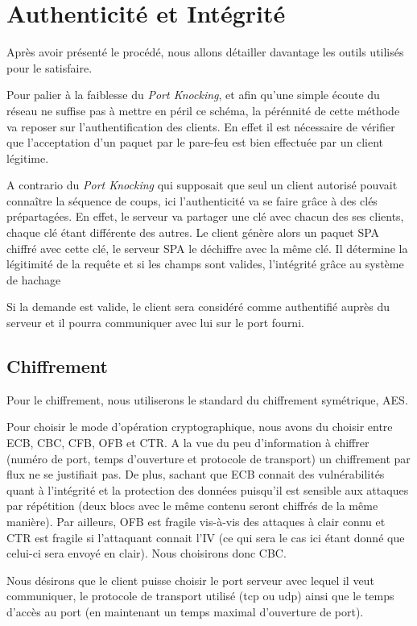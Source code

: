 \chapter{Authenticité et Intégrité}
Après avoir présenté le procédé, nous allons détailler davantage les outils utilisés pour le satisfaire.

Pour palier à la faiblesse du \emph{Port Knocking}, et afin qu'une simple écoute du réseau ne suffise pas à mettre en péril ce schéma, la pérénnité de cette méthode va reposer sur l'authentification des clients. En effet il est nécessaire de vérifier que l'acceptation d'un paquet par le pare-feu est bien effectuée par un client légitime.

A contrario du \emph{Port Knocking} qui supposait que seul un client autorisé pouvait connaître la séquence de coups, ici l'authenticité va se faire grâce à des clés prépartagées. En effet, le serveur va partager une clé avec chacun des ses clients, chaque clé étant différente des autres. 
Le client génère alors un paquet SPA chiffré avec cette clé, le serveur SPA le déchiffre avec la même clé. Il détermine la légitimité de la requête et si les champs sont valides, l'intégrité grâce au système de hachage

Si la demande est valide, le client sera considéré comme authentifié auprès du serveur et il pourra communiquer avec lui sur le port fourni.

\section{Chiffrement}
Pour le chiffrement, nous utiliserons le standard du chiffrement symétrique, AES. 

Pour choisir le mode d'opération cryptographique, nous avons du choisir entre ECB, CBC, CFB, OFB et CTR. 
A la vue du peu d'information à chiffrer (numéro de port, temps d'ouverture et protocole de transport) un chiffrement par flux ne se justifiait pas.
De plus, sachant que ECB connait des vulnérabilités quant à l'intégrité et la protection des données puisqu'il est sensible aux attaques par répétition (deux blocs avec le même contenu seront chiffrés de la même manière).
Par ailleurs, OFB est fragile vis-à-vis des attaques à clair connu et CTR est fragile si l'attaquant connait l'IV (ce qui sera le cas ici étant donné que celui-ci sera envoyé en clair).
Nous choisirons donc CBC.


Nous désirons que le client puisse choisir le port serveur avec lequel il veut communiquer, le protocole de transport utilisé (tcp ou udp) ainsi que le temps d'accès au port (en maintenant un temps maximal d'ouverture de port).

